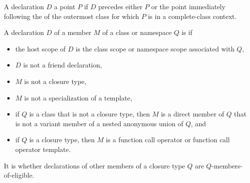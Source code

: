 \begin{itemdescr}
\pnum
A declaration $D$  a point $P$
if $D$ precedes either $P$
or the point immediately following the 
of the outermost class for which $P$ is in a complete-class context.

\pnum
A declaration $D$ of a member $M$ of a class or namespace $Q$ is
 if
\begin{itemize}
\item
  the host scope of $D$
  is the class scope or namespace scope associated with $Q$,
\item
  $D$ is not a friend declaration,
\item
  $M$ is not a closure type,
\item
  $M$ is not a specialization of a template,
\item
  if $Q$ is a class that is not a closure type,
  then $M$ is a direct member of $Q$
  that is not a variant member of a
  nested anonymous union of $Q$, and
\item
  if $Q$ is a closure type,
  then $M$ is a function call operator or function call operator template.
\end{itemize}
It is 
whether declarations of other members of a closure type $Q$
are $Q$-members-of-eligible.


\end{itemdescr}

